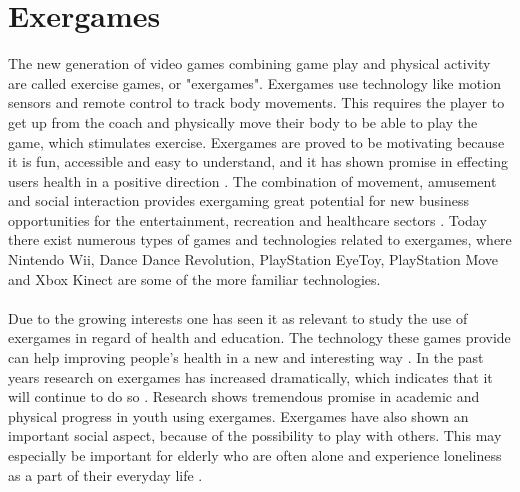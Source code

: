 \section{Exergames}
The new generation of video games combining game play and physical activity are called exercise games, or "exergames". Exergames use technology like motion sensors and remote control to track body movements. This requires the player to get up from the coach and physically move their body to be able to play the game, which stimulates exercise. Exergames are proved to be motivating because it is fun, accessible and easy to understand, and it has shown promise in effecting users health in a positive direction \cite{promotingexercise}. The combination of movement, amusement and social interaction provides exergaming great potential for new business opportunities for the entertainment, recreation and healthcare sectors \cite{gamingforhealth}. Today there exist numerous types of games and technologies related to exergames, where Nintendo Wii, Dance Dance Revolution, PlayStation EyeToy, PlayStation Move and Xbox Kinect are some of the more familiar technologies. \\ \\
Due to the growing interests one has seen it as relevant to study the use of exergames in regard of health and education. The technology these games provide can help improving people's health in a new and interesting way \cite{gamingforhealth}. In the past years research on exergames has increased dramatically, which indicates that it will continue to do so \cite{chamberlin2008exergames}. Research shows tremendous promise in academic and physical progress in youth using exergames. Exergames have also shown an important social aspect, because of the possibility to play with others. This may especially be important for elderly who are often alone and experience loneliness as a part of their everyday life \cite{exergamesforelderly}. \\ \\

